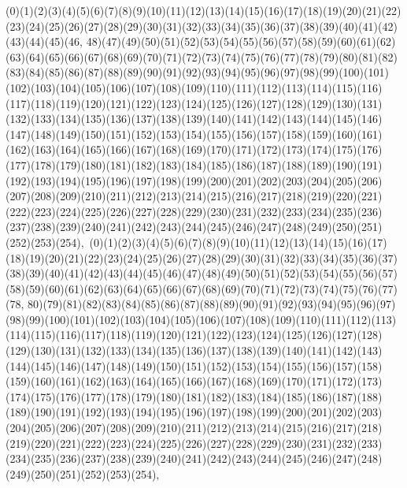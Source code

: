 \documentclass[12pt]{article}
\begin{document}
{(0)(1)(2)(3)(4)(5)(6)(7)(8)(9)(10)(11)(12)(13)(14)(15)(16)(17)(18)(19)(20)(21)(22)(23)(24)(25)(26)(27)(28)(29)(30)(31)(32)(33)(34)(35)(36)(37)(38)(39)(40)(41)(42)(43)(44)(45)(46, 48)(47)(49)(50)(51)(52)(53)(54)(55)(56)(57)(58)(59)(60)(61)(62)(63)(64)(65)(66)(67)(68)(69)(70)(71)(72)(73)(74)(75)(76)(77)(78)(79)(80)(81)(82)(83)(84)(85)(86)(87)(88)(89)(90)(91)(92)(93)(94)(95)(96)(97)(98)(99)(100)(101)(102)(103)(104)(105)(106)(107)(108)(109)(110)(111)(112)(113)(114)(115)(116)(117)(118)(119)(120)(121)(122)(123)(124)(125)(126)(127)(128)(129)(130)(131)(132)(133)(134)(135)(136)(137)(138)(139)(140)(141)(142)(143)(144)(145)(146)(147)(148)(149)(150)(151)(152)(153)(154)(155)(156)(157)(158)(159)(160)(161)(162)(163)(164)(165)(166)(167)(168)(169)(170)(171)(172)(173)(174)(175)(176)(177)(178)(179)(180)(181)(182)(183)(184)(185)(186)(187)(188)(189)(190)(191)(192)(193)(194)(195)(196)(197)(198)(199)(200)(201)(202)(203)(204)(205)(206)(207)(208)(209)(210)(211)(212)(213)(214)(215)(216)(217)(218)(219)(220)(221)(222)(223)(224)(225)(226)(227)(228)(229)(230)(231)(232)(233)(234)(235)(236)(237)(238)(239)(240)(241)(242)(243)(244)(245)(246)(247)(248)(249)(250)(251)(252)(253)(254)$
, 
$
(0)(1)(2)(3)(4)(5)(6)(7)(8)(9)(10)(11)(12)(13)(14)(15)(16)(17)(18)(19)(20)(21)(22)(23)(24)(25)(26)(27)(28)(29)(30)(31)(32)(33)(34)(35)(36)(37)(38)(39)(40)(41)(42)(43)(44)(45)(46)(47)(48)(49)(50)(51)(52)(53)(54)(55)(56)(57)(58)(59)(60)(61)(62)(63)(64)(65)(66)(67)(68)(69)(70)(71)(72)(73)(74)(75)(76)(77)(78, 80)(79)(81)(82)(83)(84)(85)(86)(87)(88)(89)(90)(91)(92)(93)(94)(95)(96)(97)(98)(99)(100)(101)(102)(103)(104)(105)(106)(107)(108)(109)(110)(111)(112)(113)(114)(115)(116)(117)(118)(119)(120)(121)(122)(123)(124)(125)(126)(127)(128)(129)(130)(131)(132)(133)(134)(135)(136)(137)(138)(139)(140)(141)(142)(143)(144)(145)(146)(147)(148)(149)(150)(151)(152)(153)(154)(155)(156)(157)(158)(159)(160)(161)(162)(163)(164)(165)(166)(167)(168)(169)(170)(171)(172)(173)(174)(175)(176)(177)(178)(179)(180)(181)(182)(183)(184)(185)(186)(187)(188)(189)(190)(191)(192)(193)(194)(195)(196)(197)(198)(199)(200)(201)(202)(203)(204)(205)(206)(207)(208)(209)(210)(211)(212)(213)(214)(215)(216)(217)(218)(219)(220)(221)(222)(223)(224)(225)(226)(227)(228)(229)(230)(231)(232)(233)(234)(235)(236)(237)(238)(239)(240)(241)(242)(243)(244)(245)(246)(247)(248)(249)(250)(251)(252)(253)(254)$
, 
$
}
\end{document}
